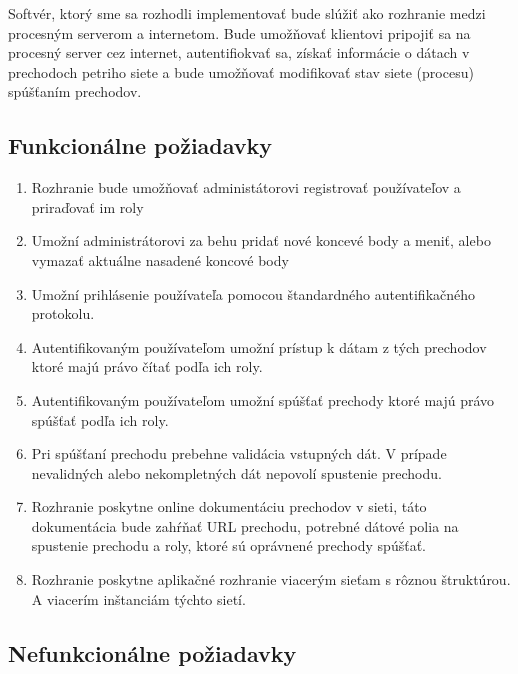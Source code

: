 Softvér, ktorý sme sa rozhodli implementovať bude slúžiť ako rozhranie medzi procesným serverom a internetom. Bude umožňovať klientovi pripojiť sa na procesný server cez internet, autentifiokvať sa, získať informácie o dátach v prechodoch petriho siete a bude umožňovať modifikovať stav siete (procesu) spúšťaním prechodov. 

  
\subsection{Funkcionálne požiadavky} 

\begin{enumerate} 
    \item Rozhranie bude umožňovať administátorovi registrovať používateľov a priraďovať im roly 
    \item Umožní administrátorovi za behu pridať nové koncevé body a meniť, alebo vymazať aktuálne nasadené koncové body 

    \item Umožní prihlásenie používateľa pomocou štandardného autentifikačného protokolu. 

    \item Autentifikovaným používateľom umožní prístup k dátam z tých prechodov ktoré majú právo čítať podľa ich roly. 

    \item Autentifikovaným používateľom umožní spúšťať prechody ktoré majú právo spúšťať podľa ich roly. 

    \item Pri spúšťaní prechodu prebehne validácia vstupných dát. V prípade nevalidných alebo nekompletných dát nepovolí spustenie prechodu. 

    \item Rozhranie poskytne online dokumentáciu prechodov v sieti, táto dokumentácia bude zahŕňať URL prechodu, potrebné dátové polia na spustenie prechodu a roly, ktoré sú oprávnené prechody spúšťať. 

    \item Rozhranie poskytne aplikačné rozhranie viacerým sieťam s rôznou štruktúrou. A viacerím inštanciám týchto sietí. 
\end{enumerate}     

 

\subsection{Nefunkcionálne požiadavky} 

